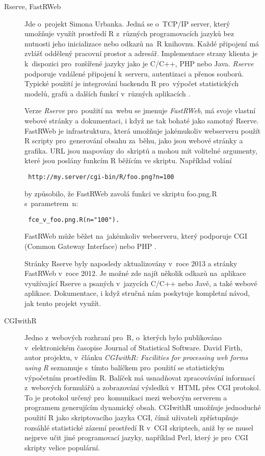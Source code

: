 \documentclass[thesis=B,czech]{FITthesis}[2012/06/26]
\begin{document}
\begin{description}
\item[Rserve, FastRWeb] \begin{sloppypar}Jde o~projekt Simona Urbanka. Jedná se o~TCP/IP server, který umožňuje využít prostředí R z~různých programovacích jazyků bez nutnosti jeho inicializace nebo odkazů na~R knihovnu. Každé připojení má zvlášť oddělený pracovní prostor a adresář. Implementace strany klienta je k~dispozici pro~rozšířené jazyky jako je C/C++, PHP nebo Java. \textit{Rserve} podporuje vzdálené připojení k~serveru, autentizaci a přenos souborů. Typické použití je integrování backendu R pro~výpočet statistických modelů, grafů a dalších funkcí v~různých aplikacích \cite{Rserve}.\end{sloppypar}

Verze \textit{Rserve} pro~použití na~webu se jmenuje \textit{FastRWeb}, má svoje vlastní webové stránky a dokumentaci, i když ne tak bohaté jako samotný Rserve. FastRWeb je infrastruktura, která umožňuje jakémukoliv webserveru použít R scripty pro~generování obsahu za~běhu, jako jsou webové stránky a grafika. URL jsou mapovány do~skriptů a mohou mít volitelné argumenty, které jsou poslány funkcím R běžícím ve skriptu. Například volání 
\begin{verbatim}
 http://my.server/cgi-bin/R/foo.png?n=100
 \end{verbatim} 
 by způsobilo, že FastRWeb zavolá funkci ve skriptu foo.png.R s~parametrem~n:  \begin{verbatim} fce_v_foo.png.R(n="100").\end{verbatim}
 FastRWeb může běžet na~jakémkoliv webserveru, který podporuje CGI (Common Gateway Interface) nebo PHP \cite{FastRWeb}. 
 
 Stránky Rserve byly naposledy aktualizovány v~roce 2013 a stránky FastRWeb v~roce 2012. Je možné zde najít několik odkazů na~aplikace využívající Rserve a psaných v~jazycích C/C++ nebo Javě, a také webové aplikace. Dokumentace, i když stručná nám poskytuje kompletní návod, jak tento projekt využít. 
 
\item[CGIwithR] \begin{sloppypar}Jedno z~webových rozhraní pro~R, o~kterých bylo publikováno v~elektronickém časopise Journal of Statistical Software. David Firth, autor projektu, v~článku \textit{CGIwithR: Facilities for processing web forms using R} \cite{CGIwithRArticle} seznamuje s~tímto balíčkem pro~použití se statistickým výpočetním prostředím R. Balíček má usnadňovat zpracovávání informací z~webových formulářů a zobrazování výsledků v~HTML přes CGI protokol. To je protokol určený pro~komunikaci mezi webovým serverem a programem generujícím dynamický obsah. CGIwithR umožňuje jednoduché použití R jako skriptovacího jazyka CGI, čímž uživateli zpřístupňuje rozsáhlé statistické zázemí prostředí R v~CGI skriptech, aniž by se musel nejprve učit jiné programovací jazyky, například Perl, který je pro~CGI skripty velice populární.\end{sloppypar} 


\end{description}
\end{document}
